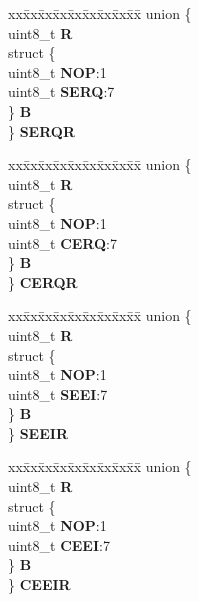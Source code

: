 \begin{DoxyCompactItemize}
\begin{tabbing}
\end{tabbing}\item 
\mbox{\label{structEDMA__tag_afa73fbb7af27c3cb7aee9f74555cee96}} 
\begin{tabbing}
xx\=xx\=xx\=xx\=xx\=xx\=xx\=xx\=xx\=\kill
union \{\\
\>uint8\_t {\bfseries R}\\
\>struct \{\\
\>\>uint8\_t {\bfseries NOP}:1\\
\>\>uint8\_t {\bfseries SERQ}:7\\
\>\} {\bfseries B}\\
\} {\bfseries SERQR}\\

\end{tabbing}\item 
\mbox{\label{structEDMA__tag_aac1a4496b049fb533a3c8ed7f5edef01}} 
\begin{tabbing}
xx\=xx\=xx\=xx\=xx\=xx\=xx\=xx\=xx\=\kill
union \{\\
\>uint8\_t {\bfseries R}\\
\>struct \{\\
\>\>uint8\_t {\bfseries NOP}:1\\
\>\>uint8\_t {\bfseries CERQ}:7\\
\>\} {\bfseries B}\\
\} {\bfseries CERQR}\\

\end{tabbing}\item 
\mbox{\label{structEDMA__tag_a728b4329f57e853755b16f880c97d30d}} 
\begin{tabbing}
xx\=xx\=xx\=xx\=xx\=xx\=xx\=xx\=xx\=\kill
union \{\\
\>uint8\_t {\bfseries R}\\
\>struct \{\\
\>\>uint8\_t {\bfseries NOP}:1\\
\>\>uint8\_t {\bfseries SEEI}:7\\
\>\} {\bfseries B}\\
\} {\bfseries SEEIR}\\

\end{tabbing}\item 
\mbox{\label{structEDMA__tag_aaef5b5231377b1c131fbe1a69ff94f31}} 
\begin{tabbing}
xx\=xx\=xx\=xx\=xx\=xx\=xx\=xx\=xx\=\kill
union \{\\
\>uint8\_t {\bfseries R}\\
\>struct \{\\
\>\>uint8\_t {\bfseries NOP}:1\\
\>\>uint8\_t {\bfseries CEEI}:7\\
\>\} {\bfseries B}\\
\} {\bfseries CEEIR}\\


\end{tabbing}
\end{DoxyCompactItemize}
